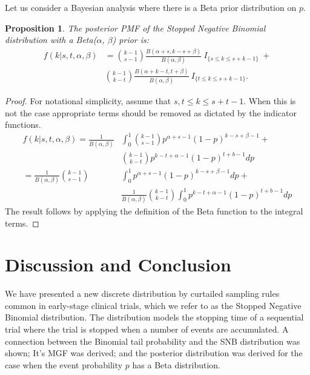 \documentclass[review]{elsarticle}
\newtheorem{prop}{Proposition}
\begin{document}
Let us consider a Bayesian analysis where there is a Beta prior distribution
on $p$.
\begin{prop}
The posterior PMF of the Stopped Negative Binomial distribution with a Beta($\alpha$, $\beta$) prior is:
\begin{align} \label{eqn:posterior}
f(k | s, t, \alpha, \beta) &= 
  {k-1 \choose s-1} \frac{B\left(\alpha+s, k-s+\beta \right)}{B(\alpha, \beta)} 
    \ I_{\{s \leq k \leq s+k-1\}} \ + \nonumber \\
  & {k-1 \choose k-t} 
    \frac{B\left(\alpha + k - t, t+\beta\right)}{B(\alpha, \beta)} 
    \ I_{\{t \leq k \leq s+k-1\}}.
\end{align}
\end{prop}
\begin{proof}
For notational simplicity, assume that $s,t \leq k \leq s+t-1$. When this is not the case appropriate terms should be removed as dictated by the indicator functions.
\begin{align*}
f(k | s, t, \alpha, \beta) = \frac{1}{B(\alpha, \beta)} & \int_0^1 {k-1 \choose s-1} p^{\alpha +s -1} \left(1-p\right)^{k-s+\beta-1} + \\
 & {k-1 \choose k-t} p^{k-t+\alpha-1}\left(1-p\right)^{t+b-1} dp \\
= \frac{1}{B(\alpha, \beta)}  {k-1 \choose s-1} & \int_0^1  p^{\alpha +s -1} \left(1-p\right)^{k-s+\beta-1} dp + \\
 & \frac{1}{B(\alpha, \beta)} {k-1 \choose k-t} \int_0^1  p^{k-t+\alpha-1}\left(1-p\right)^{t+b-1} dp
\end{align*}
The result follows by applying the definition of the Beta function to the integral terms.
\end{proof}

\section{Discussion and Conclusion}

We have presented a new discrete distribution by curtailed sampling rules 
common in early-stage clinical trials, which we refer to as the Stopped 
Negative Binomial distribution. The distribution models the stopping time of 
a sequential trial where the trial is stopped when a number of events are 
accumulated. A connection between the Binomial tail probability and the SNB
distribution was shown; It's MGF was derived; and
the posterior distribution was derived for the case when the 
event probability $p$ has a Beta distribution. 
\end{document}
